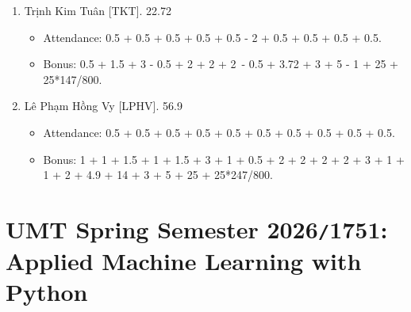 \documentclass{article}
\begin{document}
\begin{enumerate}
    \begin{itemize}
        \item Attendance: 0.5 - 2 - 2 - 2 + 0.5 + 0.5 + 0.5 + 0.5 + 0.5.
        \item Bonus: 0.5 + 1 + 25 + 25*690/800.
    \end{itemize}
    \item {\sc Trịnh Kim Tuân [TKT].} 22.72
    \begin{itemize}
        \item Attendance: 0.5 + 0.5 + 0.5 + 0.5 + 0.5 - 2 + 0.5 + 0.5 + 0.5 + 0.5.
        \item Bonus: 0.5 + 1.5 + 3 - 0.5 + 2 + 2 + 2 - 0.5 + 3.72 + 3 + 5 - 1 + 25 + 25*147/800.
    \end{itemize}
    \item {\sc Lê Phạm Hồng Vy [LPHV].} 56.9
    \begin{itemize}
        \item Attendance: 0.5 + 0.5 + 0.5 + 0.5 + 0.5 + 0.5 + 0.5 + 0.5 + 0.5 + 0.5.
        \item Bonus: 1 + 1 + 1.5 + 1 + 1.5 + 3 + 1 + 0.5 + 2 + 2 + 2 + 2 + 3 + 1 + 1 + 2 + 4.9 + 14 + 3 + 5 + 25 + 25*247/800.
    \end{itemize}
\end{enumerate}


\section{UMT Spring Semester 2026{\tt/}1751: Applied Machine Learning with Python}
\end{document}
